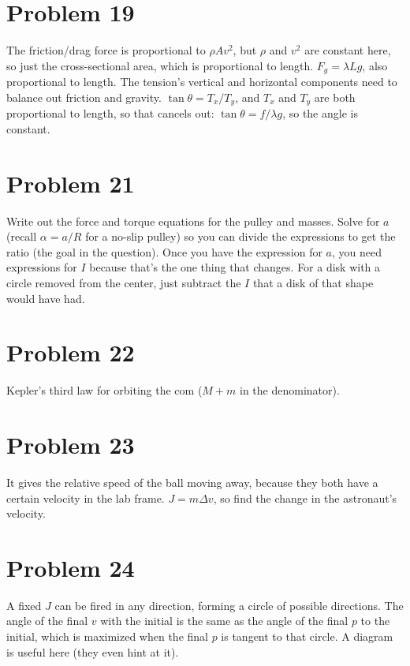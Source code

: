 \documentclass[11pt]{article}
\begin{document}
\section*{Problem 19}
The friction/drag force is proportional to $\rho Av^2$, but $\rho$ and $v^2$ are constant here, so just the cross-sectional area, which is proportional to length.
$F_g=\lambda Lg$, also proportional to length.
The tension's vertical and horizontal components need to balance out friction and gravity. $\tan\theta=T_x/T_y$, and $T_x$ and $T_y$ are both proportional to length, so that cancels out: $\tan\theta=f/\lambda g$, so the angle is constant.

\section*{Problem 21}
Write out the force and torque equations for the pulley and masses.
Solve for $a$ (recall $\alpha=a/R$ for a no-slip pulley) so you can divide the expressions to get the ratio (the goal in the question).
Once you have the expression for $a$, you need expressions for $I$ because that's the one thing that changes. For a disk with a circle removed from the center, just subtract the $I$ that a disk of that shape would have had.

\section*{Problem 22}
Kepler's third law for orbiting the com ($M+m$ in the denominator).

\section*{Problem 23}
It gives the relative speed of the ball moving away, because they both have a certain velocity in the lab frame.
$J=m\Delta v$, so find the change in the astronaut's velocity.

\section*{Problem 24}
A fixed $J$ can be fired in any direction, forming a circle of possible directions. The angle of the final $v$ with the initial is the same as the angle of the final $p$ to the initial, which is maximized when the final $p$ is tangent to that circle.
A diagram is useful here (they even hint at it).
\end{document}
